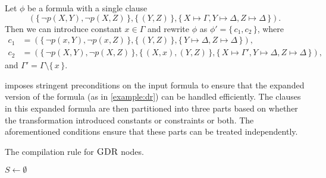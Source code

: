 \begin{example}\label{example:dr}
  Let $\phi$ be a formula with a single clause
  \[
    (\{\, \neg p(X, Y), \neg p(X, Z) \,\}, \{\, (Y, Z) \,\}, \{\, X \mapsto \Gamma, Y \mapsto \Delta, Z \mapsto \Delta \,\}).
  \]
  Then we can introduce constant $x \in \Gamma$ and rewrite $\phi$ as
  $\phi' = \{\, c_{1}, c_{2} \,\}$, where
  \begin{align*}
    c_{1} &= (\{\, \neg p(x, Y), \neg p(x, Z) \,\}, \{\, (Y, Z) \,\}, \{\, Y \mapsto \Delta, Z \mapsto \Delta \,\}), \\
    c_{2} &= (\{\, \neg p(X, Y), \neg p(X, Z) \,\}, \{\, (X, x), (Y, Z) \,\}, \{\, X \mapsto \Gamma', Y \mapsto \Delta, Z \mapsto \Delta \,\}),
  \end{align*}
  and $\Gamma' = \Gamma \setminus \{\, x \,\}$.
\end{example}

\citet{DBLP:conf/nips/Broeck11} imposes stringent preconditions on the input
formula to ensure that the expanded version of the formula (as in
\cref{example:dr}) can be handled efficiently. The clauses in this expanded
formula are then partitioned into three parts based on whether the
transformation introduced constants or constraints or both. The aforementioned
conditions ensure that these parts can be treated independently.

\begin{algorithm}[t]
  \caption{The compilation rule for $\operatorname{\textsc{GDR}}$ nodes.}\label{alg:domainrecursion}
  $S \gets \emptyset$\;
\end{algorithm}

